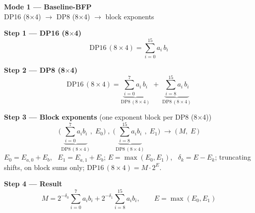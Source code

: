 \documentclass[fleqn]{article}
\newcommand{\DPop}[3]{\mathrm{DP#1}\,(#2\!\times\!#3)}
\begin{document}
\begin{center}
{\LARGE \textbf{Mode 1 --- Baseline-BFP}}\\[4pt]
{\large DP16 (8$\times$4) $\rightarrow$ DP8 (8$\times$4) $\rightarrow$ block exponents}
\end{center}

\vspace{0.5em}

\textbf{Step 1 --- DP16 (8$\times$4)}
\[ \DPop{16}{8}{4} = \sum_{i=0}^{15} a_i \, b_i \]

\vspace{0.5em}

\textbf{Step 2 --- DP8 (8$\times$4)}
\[
\DPop{16}{8}{4}
  = \underbrace{\sum_{i=0}^{7} a_i \, b_i}_{\DPop{8}{8}{4}}
  \; + \; \underbrace{\sum_{i=8}^{15} a_i \, b_i}_{\DPop{8}{8}{4}}
\]

\vspace{0.5em}

\textbf{Step 3 --- Block exponents}\quad
{\small(one exponent block per DP8 (8$\times$4))}
\[
\Big(\underbrace{\sum_{i=0}^{7} a_i b_i}_{\DPop{8}{8}{4}},\; E_0\Big) \;,\;
\Big(\underbrace{\sum_{i=8}^{15} a_i b_i}_{\DPop{8}{8}{4}},\; E_1\Big)
\;\longrightarrow\;
\Big(\, M ,\; E \,\Big)
\]
$E_0=E_{a,0}+E_b$, \ $E_1=E_{a,1}+E_b$; \quad $E=\max(E_0,E_1)$, \ $\delta_k=E-E_k$; \quad truncating shifts, on block sums only; \quad $\DPop{16}{8}{4}=M\cdot2^{E}$.

\vspace{0.5em}

\textbf{Step 4 --- Result}
\[
\boxed{\;
M = 2^{-\delta_0}\!\sum_{i=0}^{7} a_i b_i + 2^{-\delta_1}\!\sum_{i=8}^{15} a_i b_i,
\qquad E = \max(E_0,E_1)
\;}
\]
\end{document}
